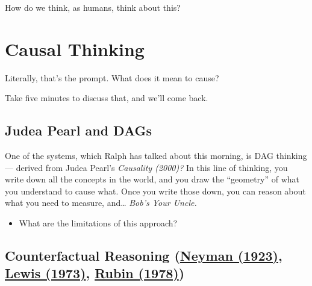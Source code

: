 \documentclass[
  letterpaper,
  DIV=11,
  numbers=noendperiod]{scrreprt}
\providecommand{\tightlist}{%
  \setlength{\itemsep}{0pt}\setlength{\parskip}{0pt}}\usepackage{longtable,booktabs,array}
\begin{document}
How do we think, as humans, think about this?

\section{Causal Thinking}\label{causal-thinking}

\begin{tcolorbox}[enhanced jigsaw, titlerule=0mm, colback=white, toptitle=1mm, toprule=.15mm, bottomtitle=1mm, colframe=quarto-callout-note-color-frame, colbacktitle=quarto-callout-note-color!10!white, bottomrule=.15mm, leftrule=.75mm, opacityback=0, title=\textcolor{quarto-callout-note-color}{\faInfo}\hspace{0.5em}{What does it mean for an action to \emph{cause} an outcome?}, opacitybacktitle=0.6, arc=.35mm, rightrule=.15mm, breakable, coltitle=black, left=2mm]

Literally, that's the prompt. What does it mean to cause?

Take five minutes to discuss that, and we'll come back.

\end{tcolorbox}

\subsection{Judea Pearl and DAGs}\label{judea-pearl-and-dags}

One of the systems, which Ralph has talked about this morning, is DAG
thinking --- derived from Judea Pearl's \emph{Causality (2000)?} In this
line of thinking, you write down all the concepts in the world, and you
draw the ``geometry'' of what you understand to cause what. Once you
write those down, you can reason about what you need to measure,
and\ldots{} \emph{Bob's Your Uncle.}

\begin{itemize}
\tightlist
\item
  What are the limitations of this approach?
\end{itemize}

\subsection{\texorpdfstring{Counterfactual Reasoning
(\href{https://www.jstor.org/stable/2245382?seq=1}{Neyman (1923)},
\href{https://web.archive.org/web/20170809031235id_/http://andrewmbailey.com/dkl/Counterfactuals_Comparative.pdf}{Lewis
(1973)}, \href{https://www.jstor.org/stable/pdf/2958688}{Rubin
(1978)})}{Counterfactual Reasoning (Neyman (1923), Lewis (1973), Rubin (1978))}}\label{counterfactual-reasoning-neyman-1923-lewis-1973-rubin-1978}
\end{document}
